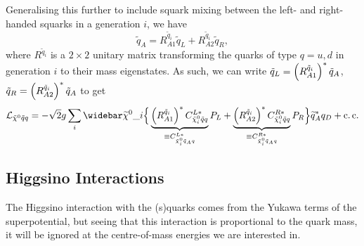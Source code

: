 \documentclass[../main.tex]{subfiles}
\begin{document}
Generalising this further to include squark mixing between the left- and
right-handed squarks in a generation \(i\), we have
\begin{equation}
    \tilde{q}_A = R_{A1}^{\tilde{q}_i} \tilde{q}_L + R_{A2}^{\tilde{q}_i} \tilde{q}_R,
\end{equation}
where \(R^{\tilde{q}_i}\) is a \(2\times 2\) unitary matrix transforming the quarks of type \(q = u, d\) in generation \(i\) to their mass eigenstates.
As such, we can write \(\tilde{q}_L = \left(R^{\tilde{q}_i}_{A1}\right)^\ast \tilde{q}_A\), \(\tilde{q}_R = \left(R^{\tilde{q}_i}_{A2}\right)^\ast \tilde{q}_A\) to get
\begin{equation}
    \label{susy:eq:nino_sqA_f_int}
    \L_{\tilde{\chi}^0 \tilde{q} q} = -\sqrt{2} g \sum_{i} \barnino[i] \Big\{ \underbrace{\pclosed{R^{\tilde{q}_i}_{A1}}^\ast C_{\tilde{\chi}^0_i \tilde{q} q}^{L\ast}}_{\equiv C_{\tilde{\chi}^0_i \tilde{q}_A q}^{L\ast}} P_L + \underbrace{\pclosed{R^{\tilde{q}_i}_{A2}}^\ast C_{\tilde{\chi}^0_i \tilde{q} q}^{R\ast}}_{\equiv C_{\tilde{\chi}^0_i \tilde{q}_A q}^{R\ast}} P_R \Big\} \wtilde{q}_A^\ast q_D + \cc
\end{equation}

\subsection{Higgsino Interactions}
The Higgsino interaction with the (s)quarks comes from the Yukawa terms of the
superpotential, but seeing that this interaction is proportional to the quark
mass, it will be ignored at the centre-of-mass energies we are interested in.
\end{document}
